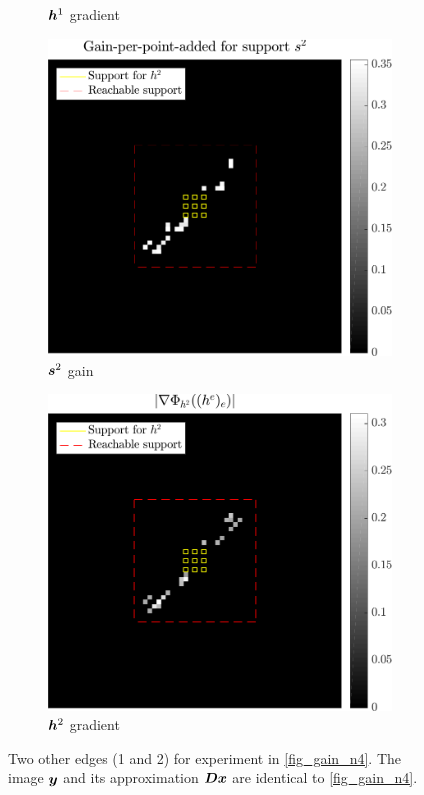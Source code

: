 \begin{figure}[!ht]
\begin{subfigure}[b]{0.24\linewidth}
	\caption{$\bm{h}^1$ gradient}
	\end{subfigure}
	\begin{subfigure}[b]{0.24\linewidth}\centering
	\includegraphics[width=\linewidth]{figures/xp/n2/xp_128x128_sc2_angl1_K3_S3_node2_objmatrix_bestvalues.pdf}
	\caption{$\bm{s}^2$ gain}
	\end{subfigure}
	\begin{subfigure}[b]{0.24\linewidth}\centering
	\includegraphics[width=\linewidth]{figures/xp/n2/xp_128x128_sc2_angl1_K3_S3_node2_partgrad2_bestvalues.pdf}
	\caption{$\bm{h}^2$ gradient}
	\end{subfigure}
\caption{Two other edges (1 and 2) for experiment in \cref{fig_gain_n4}. The image $\bm{y}$ and its approximation $\bm{D}\bm{x}$ are identical to \cref{fig_gain_n4}.}\label{fig_gain_n1_n2}
\end{figure}


